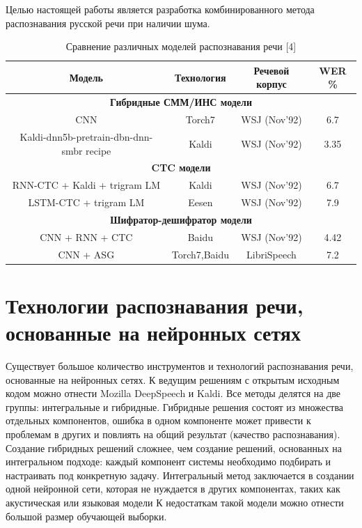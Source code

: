 \documentclass[conference]{IEEEtran}
\begin{document}
    Целью настоящей работы является разработка комбинированного метода распознавания русской речи при наличии шума.

    \begin{table}[htp]
        \caption{Сравнение различных моделей распознавания речи [4]}
        \begin{center}
            \begin{tabular}{|c|c|c|c|}
                \hline
                Модель & Технология & Речевой корпус & WER \% \\
                \hline
                \multicolumn{4}{|c|}{\textbf{Гибридные СММ/ИНС модели}} \\
                \hline
                CNN & Torch7 & WSJ (Nov’92) & 6.7 \\
                \hline
                Kaldi-dnn5b-pretrain-dbn-dnn-smbr recipe & Kaldi & WSJ (Nov’92) & 3.35 \\
                \hline
                \multicolumn{4}{|c|}{\textbf{CTC модели}} \\
                \hline
                RNN-CTC + Kaldi + trigram LM & Kaldi & WSJ (Nov’92) & 6.7 \\
                \hline
                LSTM-CTC + trigram LM & Eesen & WSJ (Nov’92) & 7.9 \\
                \hline
                \multicolumn{4}{|c|}{\textbf{Шифратор-дешифратор модели}} \\
                \hline
                CNN + RNN + CTC & Baidu & WSJ (Nov’92) & 4.42 \\
                \hline
                CNN + ASG & Torch7,Baidu & LibriSpeech & 7.2 \\
                \hline
            \end{tabular}
            \label{tab1}
        \end{center}
    \end{table}


    \section{Технологии распознавания речи, основанные на нейронных сетях}
    Существует большое количество инструментов и технологий распознавания речи, основанные на нейронных сетях.
    К ведущим решениям с открытым исходным кодом можно отнести Mozilla DeepSpeech и Kaldi.
    Все методы делятся на две группы: интегральные и гибридные.
    Гибридные решения состоят из множества отдельных компонентов, ошибка в одном компоненте может привести к проблемам в других и повлиять на общий результат (качество распознавания).
    Создание гибридных решений сложнее, чем создание решений, основанных на интегральном подходе: каждый компонент системы необходимо подбирать и настраивать под конкретную задачу.
    Интегральный метод заключается в создании одной нейронной сети, которая не нуждается в других компонентах, таких как акустическая или языковая модели
    К недостаткам такой модели можно отнести большой размер обучающей выборки.
\end{document}
